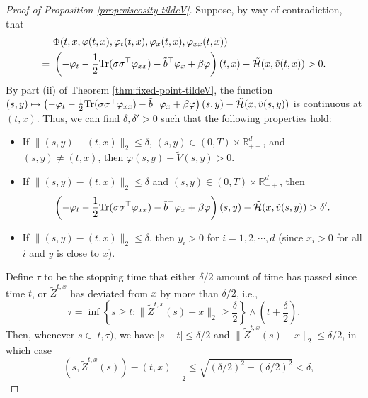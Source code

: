 \documentclass[11pt]{article}
\theoremstyle{definition}
\theoremstyle{plain}
\newcommand{\R}{\mathbb{R}}
\newcommand{\cH}{{\cal H}}
\newcommand{\tb}{\tilde{b}}
\begin{document}
\begin{proof}[Proof of Proposition \ref{prop:viscosity-tildeV}]
Suppose, by way of contradiction, that 
\begin{align}
&~\Phi(t,x,\varphi(t,x), \varphi_t(t,x), \varphi_x(t,x), \varphi_{xx}(t,x)) \nonumber \\
= &~\left(-\varphi_t - \frac{1}{2} \mathrm{Tr}(\sigma \sigma^{\top} \varphi_{xx}) -\tb^{\top}\varphi_x + \beta \varphi \right)(t,x) - \tilde \cH (x, \tilde v (t,x)) > 0.
\label{eq:viscosity2}
\end{align}
By part (ii) of Theorem \ref{thm:fixed-point-tildeV}, 
the function $(s,y) \mapsto \left(-\varphi_t - \frac{1}{2} \mathrm{Tr}(\sigma \sigma^{\top} \varphi_{xx}) -\tb^{\top}\varphi_x + \beta \varphi \right)(s,y) - \tilde \cH (x, \tilde v (s,y))$ 
is continuous at $(t,x)$. Thus, we can find $\delta, \delta'>0$ such that the following properties hold:
\begin{itemize}
\item[(a)] If $\|(s,y) - (t,x)\|_2 \leq \delta$, $(s,y) \in (0,T)\times \R_{++}^d$, and $(s,y) \neq (t,x)$, then
$\varphi(s,y) - \tilde{V}(s,y) > 0$.
\item[(b)] If $\|(s,y) - (t,x)\|_2 \leq \delta$ and $(s,y) \in (0,T)\times \R_{++}^d$, then
\begin{equation}\label{eq:viscosity3}
\left(-\varphi_t - \frac{1}{2} \mathrm{Tr}(\sigma \sigma^{\top} \varphi_{xx}) -\tb^{\top}\varphi_x + \beta \varphi \right)(s,y) - \tilde \cH (x, \tilde v (s,y))  > \delta'.
\end{equation}
\item[(c)] If $\|(s,y) - (t,x)\|_2 \leq \delta$, then $y_i > 0$ for $i = 1, 2, \cdots, d$ (since $x_i > 0$ for all $i$ and $y$ is close to $x$).  
\end{itemize}
Define $\tau$ to be the stopping time that either $\delta/2$ amount of time has passed since time $t$, 
or $\tilde Z^{t,x}$ has deviated from $x$ by more than $\delta/2$, i.e.,
\begin{equation}
\tau = \inf \left\{s\ge t: \|\tilde Z^{t,x}(s) - x\|_2\ge \frac{\delta}{2} \right\} \wedge \left(t+\frac{\delta}{2}\right). 
\end{equation}
Then, whenever $s \in [t, \tau)$, we have $|s-t| \leq \delta/2$ 
and $\|\tilde Z^{t,x}(s) - x\|_2 \le \delta/2$, in which case 
\[
\left\|(s, \tilde Z^{t,x}(s)) - (t,x)\right\|_2 \leq \sqrt{ (\delta/2)^2 + (\delta/2)^2} < \delta,
\]
\end{proof}
\end{document}
